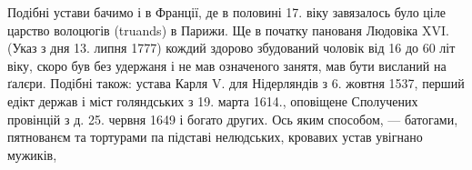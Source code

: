 Подібні устави бачимо і в Франції, де в половині 17.
віку завязалось було ціле царство волоцюгів (truands) в Парижи.
Ще в початку панованя Людовіка XVI. (Указ з дня
13. липня 1777) кождий здорово збудований чоловік від 16
до 60 літ віку, скоро був без удержаня і не мав означеного
занятя, мав бути висланий на ґалєри. Подібні також: устава
Карля V. для Нідерляндів з 6. жовтня 1537, перший едікт
держав і міст голяндських з 19. марта 1614., оповіщене Сполучених
провінцій з д. 25. червня 1649 і богато других.
Ось яким способом, — батогами, пятнованєм та тортурами
па підставі нелюдських, кровавих устав увігнано мужиків, \parbreak{}
